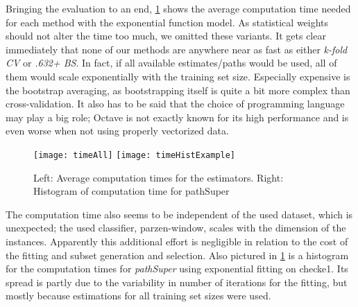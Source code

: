 Bringing the evaluation to an end, \ref{fig:compTimeAll} shows the average computation time needed for each method with the exponential function model. As statistical weights should not alter the time too much, we omitted these variants. It gets clear immediately that none of our methods are anywhere near as fast as either \textit{k-fold CV} or \textit{.632+ BS}. In fact, if all available estimates/paths would be used, all of them would scale exponentially with the training set size. Especially expensive is the bootstrap averaging, as bootstrapping itself is quite a bit more complex than cross-validation. It also has to be said that the choice of programming language may play a big role; Octave is not exactly known for its high performance and is even worse when not using properly vectorized data.

\begin{figure}[h]
	\centering
	\texttt{[image: timeAll]}
	\texttt{[image: timeHistExample]}
	\caption{Left: Average computation times for the estimators. Right: Histogram of computation time for pathSuper}
	\label{fig:compTimeAll}
\end{figure}

The computation time also seems to be independent of the used dataset, which is unexpected; the used classifier, parzen-window, scales with the dimension of the instances. Apparently this additional effort is negligible in relation to the cost of the fitting and subset generation and selection. Also pictured in \ref{fig:compTimeAll} is a histogram for the computation times for \textit{pathSuper} using exponential fitting on checke1. Its spread is partly due to the variability in number of iterations for the fitting, but mostly because estimations for all training set sizes were used.
